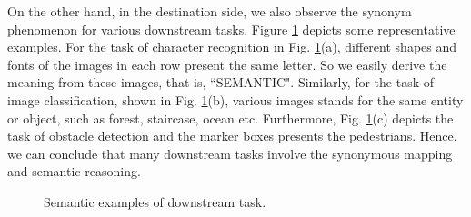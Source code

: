 \documentclass[12pt, draftclsnofoot,onecolumn]{IEEEtran}
\begin{document}
On the other hand, in the destination side, we also observe the synonym phenomenon for various downstream tasks. Figure \ref{downstreamtask_synonym_example} depicts some representative examples. For the task of character recognition in Fig. \ref{downstreamtask_synonym_example}(a), different shapes and fonts of the images in each row present the same letter. So we easily derive the meaning from these images, that is, ``SEMANTIC". Similarly, for the task of image classification, shown in Fig. \ref{downstreamtask_synonym_example}(b), various images stands for the same entity or object, such as forest, staircase, ocean etc. Furthermore, Fig. \ref{downstreamtask_synonym_example}(c) depicts the task of obstacle detection and the marker boxes presents the pedestrians. Hence, we can conclude that many downstream tasks involve the synonymous mapping and semantic reasoning.

\begin{figure}[htbp]
\setlength{\abovecaptionskip}{0.cm}
\setlength{\belowcaptionskip}{-0.cm}
  \caption{Semantic examples of downstream task.}\label{downstreamtask_synonym_example}
\end{figure}
\end{document}
